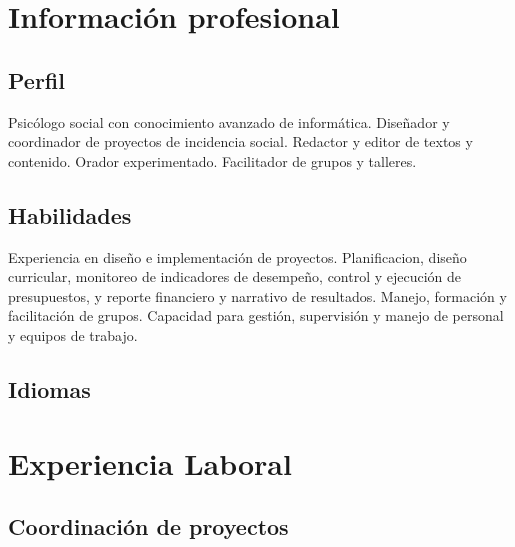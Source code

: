 \documentclass[xcolor=svgnames,color=DarkSlateGray]{komacv}
\begin{document}
\maketitle

\section{Información profesional}
\subsection{Perfil}
\raggedright
  Psicólogo social con conocimiento avanzado de informática. Diseñador y coordinador de proyectos de incidencia social. Redactor y editor de textos y contenido. Orador experimentado. Facilitador de grupos y talleres.
\subsection{Habilidades}
\raggedright
  Experiencia en diseño e implementación de proyectos. Planificacion, diseño curricular, monitoreo de indicadores de desempeño, control y ejecución de presupuestos, y reporte financiero y narrativo de resultados. Manejo, formación y facilitación de grupos. Capacidad para gestión, supervisión y manejo de personal y equipos de trabajo.

\subsection{Idiomas}

\section{Experiencia Laboral}
\subsection{Coordinación de proyectos}
\end{document}
